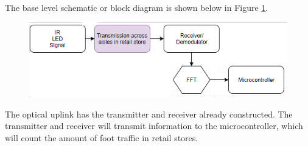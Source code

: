 



The base level schematic or block diagram is shown below in Figure \ref{fig:blockproposal}.
\begin{figure}
	\centering
	\includegraphics[width=0.7\linewidth]{Proposed_work/blockproposal}
	\caption[System level schematic of foot-traffic sensor]{}
	\caption{}
	\label{fig:blockproposal}
\end{figure}

The optical uplink has the transmitter and receiver already constructed. The transmitter and receiver will transmit information to the microcontroller, which will count the amount of foot traffic in retail stores. 


